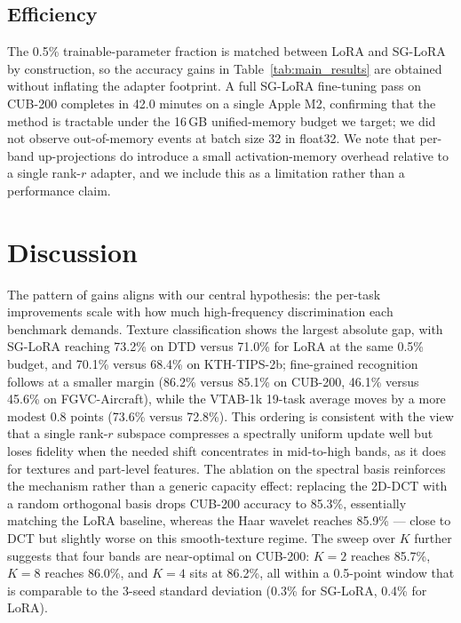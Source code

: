 \documentclass{article}
\begin{document}
\subsection{Efficiency}

The 0.5\% trainable-parameter fraction is matched between LoRA and SG-LoRA by construction, so the accuracy gains in Table~\ref{tab:main_results} are obtained without inflating the adapter footprint. A full SG-LoRA fine-tuning pass on CUB-200 completes in 42.0 minutes on a single Apple M2, confirming that the method is tractable under the 16\,GB unified-memory budget we target; we did not observe out-of-memory events at batch size 32 in float32. We note that per-band up-projections do introduce a small activation-memory overhead relative to a single rank-$r$ adapter, and we include this as a limitation rather than a performance claim.

\section{Discussion}
The pattern of gains aligns with our central hypothesis: the per-task improvements scale with how much high-frequency discrimination each benchmark demands. Texture classification shows the largest absolute gap, with SG-LoRA reaching 73.2\% on DTD versus 71.0\% for LoRA at the same 0.5\% budget, and 70.1\% versus 68.4\% on KTH-TIPS-2b; fine-grained recognition follows at a smaller margin (86.2\% versus 85.1\% on CUB-200, 46.1\% versus 45.6\% on FGVC-Aircraft), while the VTAB-1k 19-task average moves by a more modest 0.8 points (73.6\% versus 72.8\%). This ordering is consistent with the view that a single rank-$r$ subspace compresses a spectrally uniform update well but loses fidelity when the needed shift concentrates in mid-to-high bands, as it does for textures and part-level features. The ablation on the spectral basis reinforces the mechanism rather than a generic capacity effect: replacing the 2D-DCT with a random orthogonal basis drops CUB-200 accuracy to 85.3\%, essentially matching the LoRA baseline, whereas the Haar wavelet reaches 85.9\% — close to DCT but slightly worse on this smooth-texture regime. The sweep over $K$ further suggests that four bands are near-optimal on CUB-200: $K{=}2$ reaches 85.7\%, $K{=}8$ reaches 86.0\%, and $K{=}4$ sits at 86.2\%, all within a 0.5-point window that is comparable to the 3-seed standard deviation (0.3\% for SG-LoRA, 0.4\% for LoRA).
\end{document}
